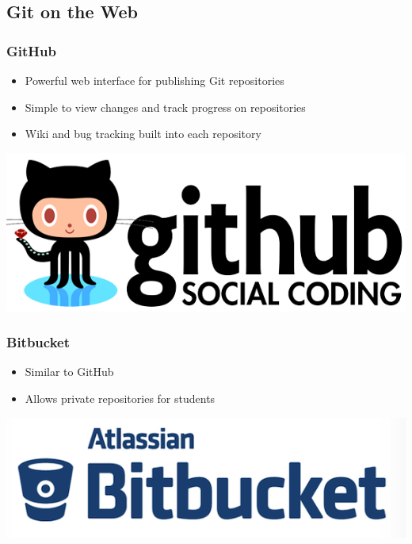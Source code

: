 \documentclass[english,compress]{beamer}
\begin{document}
\subsection{Git on the Web}
\frame
{
    \frametitle{GitHub}

    \begin{itemize}
        \item Powerful web interface for publishing Git repositories
        \item Simple to view changes and track progress on repositories
        \item Wiki and bug tracking built into each repository
    \end{itemize}

    \begin{center}
        \includegraphics[width=.8\textwidth]{figs/github-logo.png}
    \end{center}
}

\frame
{
    \frametitle{Bitbucket}

    \begin{itemize}
        \item Similar to GitHub
        \item Allows private repositories for students
    \end{itemize}

    \begin{center}
        \includegraphics[width=.8\textwidth]{figs/bitbucket-logo.png}
    \end{center}
}
\end{document}
